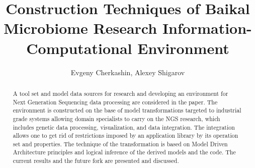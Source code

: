 \documentclass[a4paper]{jpconf}
\begin{document}
\title{Construction Techniques of Baikal Microbiome Research Information-Computational Environment}

\author{Evgeny Cherkashin, Alexey Shigarov}

\address{Matrosov Institute for System Dynamics and Control Theory, Siberian Branch of Russian Academy of Sciences, Irkutsk, Russia}





\begin{abstract}%
A tool set and model data sources for research and developing an environment for Next Generation Sequencing data processing are considered in the paper.  The environment is constructed on the base of model transformations targeted to industrial grade systems allowing domain specialists to carry on the NGS research, which includes genetic data processing, visualization, and data integration.  The integration allows one to get rid of restrictions imposed by an application library by its operation set and properties.  The technique of the transformation is based on Model Driven Architecture principles and logical inference of the derived models and the code.  The current results and the future fork are presented and discussed.
\end{abstract}
\end{document}
